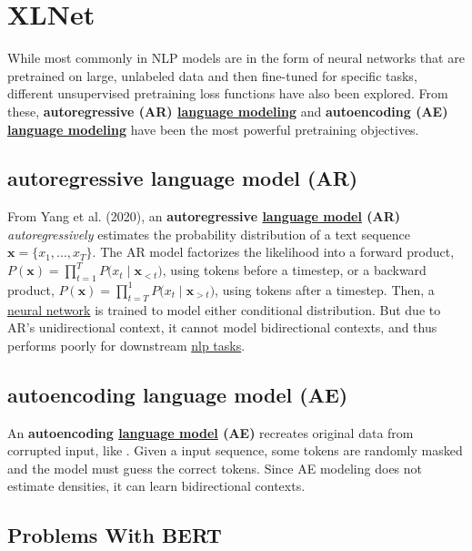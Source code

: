 \section{XLNet} \label{sec:XLNet}

While most commonly in NLP models are in the form of neural networks that are pretrained on large, unlabeled data and then fine-tuned for specific tasks, different unsupervised pretraining loss functions have also been explored. From these, \textbf{autoregressive (AR) \hyperref[sec:LanguageModels]{language modeling} } and \textbf{autoencoding (AE) \hyperref[sec:LanguageModels]{language modeling} } have been the most powerful pretraining objectives. 

\subsection{autoregressive language model (AR)}\label{sec:autoregressiveLM}

From Yang et al. (2020), an \textbf{autoregressive \hyperref[sec:LanguageModels]{language model} (AR)} \emph{autoregressively} estimates the probability distribution of a text sequence $\textbf{x} = \Big\{ x_1,...,x_T \Big\}$. The AR model factorizes the likelihood into a forward product, $P(\textbf{x}) = \prod_{t=1}^T P \Big(x_t \; | \; \textbf{x}_{< t} \Big)$, using tokens before a timestep, or a backward product, $P(\textbf{x}) = \prod_{t=T}^1 P \Big(x_t \; | \; \textbf{x}_{> t} \Big)$, using tokens after a timestep. Then, a \hyperref[sec:NeuralLM]{neural network} is trained to model either conditional distribution. But due to AR's unidirectional context, it cannot model bidirectional contexts, and thus performs poorly for downstream \hyperref[app:Appendix_NLPTasks]{nlp tasks}. 

\subsection{autoencoding language model (AE)}\label{sec:autoencodingLM}

An \textbf{autoencoding \hyperref[sec:LanguageModels]{language model} (AE)} recreates original data from corrupted input, like . Given a input sequence, some tokens are randomly masked and the model must guess the correct tokens. Since AE modeling does not estimate densities, it can learn bidirectional contexts. 


\subsection{Problems With BERT}

